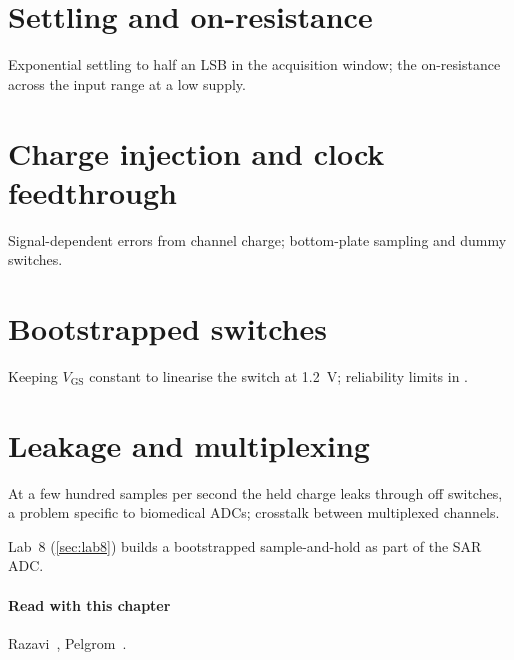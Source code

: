 \section{Settling and on-resistance}\label{sec:ch15-2}
Exponential settling to half an LSB in the acquisition window; the on-resistance across the input range at a low supply.

\section{Charge injection and clock feedthrough}\label{sec:ch15-3}
Signal-dependent errors from channel charge; bottom-plate sampling and dummy switches.

\section{Bootstrapped switches}\label{sec:ch15-4}
Keeping $V_\mathrm{GS}$ constant to linearise the switch at \qty{1.2}{\volt}; reliability limits in \sgx{}.

\section{Leakage and multiplexing}\label{sec:ch15-5}
At a few hundred samples per second the held charge leaks through off switches, a problem specific to biomedical ADCs; crosstalk between multiplexed channels.

\begin{tryit}
Lab~8 (\cref{sec:lab8}) builds a bootstrapped sample-and-hold as part of the SAR ADC.
\end{tryit}

\paragraph{Read with this chapter} Razavi~\cite{razavi}, Pelgrom~\cite{pelgrom}.
